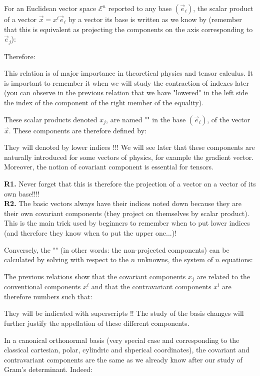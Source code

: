 	For an Euclidean vector space $\mathcal{E}^n$ reported to any base $(\vec{e}_i)$, the scalar product of a vector $\vec{x}=x^i\vec{e}_i$ by a vector its base is written as we know by (remember that this is equivalent as projecting the components on the axis corresponding to $\vec{e}_j$):
	
	Therefore:
	
	This relation is of major importance in theoretical physics and tensor calculus. It is important to remember it when we will study the contraction of indexes later (you can observe in the previous relation that we have "lowered" in the left side the index of the component of the right member of the equality).
	
	These scalar products denoted $x_j$, are named "" in the base $(\vec{e}_i)$, of the vector $\vec{x}$. These components are therefore defined by:
	
	They will denoted by lower indices !!! We will see later that these components are naturally introduced for some vectors of physics, for example the gradient vector. Moreover, the notion of covariant component is essential for tensors.
	
	\begin{tcolorbox}[title=Remarks,colframe=black,arc=10pt]
	\textbf{R1.} Never forget that this is therefore the projection of a vector on a vector of its own base!!!!\\
	
	\textbf{R2.} The basic vectors always have their indices noted down because they are their own covariant components (they project on themselves by scalar product). This is the main trick used by beginners to remember when to put lower indices (and therefore they know when to put the upper one...)!
	\end{tcolorbox}
	Conversely, the "" (in other words: the non-projected components) can be calculated by solving with respect to the $n$ unknowns, the system of $n$ equations:
	
	The previous relations show that the covariant components $x_j$ are related to the conventional components $x^i$ and that the contravariant components $x^i$ are therefore numbers such that:
	
	They will be indicated with superscripts !! The study of the basis changes will further justify the appellation of these different components.
	
	In a canonical orthonormal basis (very special case and corresponding to the classical cartesian, polar, cylindric and shperical coordinates), the covariant and contravariant components are the same as we already know after our study of Gram's determinant. Indeed:
	
